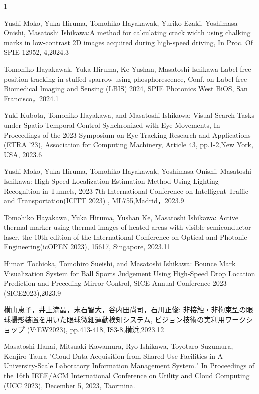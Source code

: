 \begin{査読付}{1}


Yushi Moko, Yuka Hiruma, Tomohiko Hayakawak, Yuriko Ezaki, Yoshimasa Onishi, Masatoshi Ishikawa:A method for calculating crack width using chalking marks in low-contrast 2D images acquired during high-speed driving, In Proc. Of SPIE 12952, 4,2024.3

Tomohiko Hayakawak, Yuka Hiruma, Ke Yushan, Masatoshi Ishikawa
Label-free position tracking in stuffed sparrow using phosphorescence, Conf. on Label-free Biomedical Imaging and Sensing (LBIS) 2024, SPIE Photonics West BiOS, San Francisco，2024.1

Yuki Kubota, Tomohiko Hayakawa, and Masatoshi Ishikawa: Visual Search Tasks under Spatio-Temporal Control Synchronized with Eye Movements, In Proceedings of the 2023 Symposium on Eye Tracking Research and Applications (ETRA '23), Association for Computing Machinery, Article 43, pp.1-2,New York, USA, 2023.6

Yushi Moko, Yuka Hiruma, Tomohiko Hayakawak, Yoshimasa Onishi, Masatoshi Ishikawa:  High-Speed Localization Estimation Method Using Lighting Recognition in Tunnels, 2023 7th International Conference on Intelligent Traffic and Transportation(ICITT 2023) , ML755,Madrid，2023.9

Tomohiko Hayakawa, Yuka Hiruma, Yushan Ke, Masatoshi Ishikawa: Active thermal marker using thermal images of heated areas with visible semiconductor laser, the 10th edition of the International Conference on Optical and Photonic Engineering(icOPEN 2023), 15617, Singapore, 2023.11

Himari Tochioka, Tomohiro Sueishi, and Masatoshi Ishikawa: Bounce Mark Visualization System for Ball Sports Judgement Using High-Speed Drop Location Prediction and Preceding Mirror Control, SICE Annual Conference 2023 (SICE2023),2023.9

横山恵子，井上満晶，末石智大，谷内田尚司，石川正俊: 非接触・非拘束型の眼球撮影装置を用いた眼球微細運動検知システム, ビジョン技術の実利用ワークショップ (ViEW2023), pp.413-418, IS3-8,横浜,2023.12


Masatoshi Hanai, Mitsuaki Kawamura, Ryo Ishikawa, Toyotaro Suzumura, Kenjiro Taura
"Cloud Data Acquisition from Shared-Use Facilities in A University-Scale Laboratory Information Management System."
In Proceedings of the 16th IEEE/ACM International Conference on Utility and Cloud Computing (UCC 2023), December 5, 2023, Taormina.


\end{査読付}
